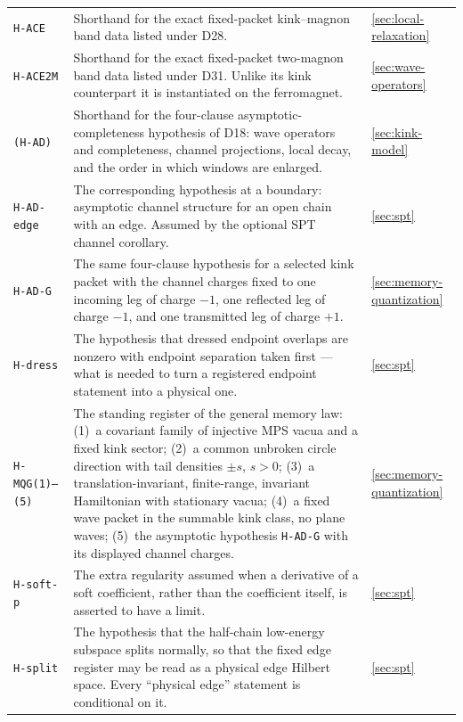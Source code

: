 {\begin{longtable}{@{}p{}p{}p{}@{}}
\texttt{H-ACE} & Shorthand for the exact fixed-packet kink--magnon band data
listed under D28. & \cref{sec:local-relaxation}\\

\texttt{H-ACE2M} & Shorthand for the exact fixed-packet two-magnon band data
listed under D31. Unlike its kink counterpart it is instantiated on the
ferromagnet. & \cref{sec:wave-operators}\\

\texttt{(H-AD)} & Shorthand for the four-clause asymptotic-completeness
hypothesis of D18: wave operators and completeness, channel projections, local
decay, and the order in which windows are enlarged. & \cref{sec:kink-model}\\

\texttt{H-AD-edge} & The corresponding hypothesis at a boundary: asymptotic
channel structure for an open chain with an edge. Assumed by the optional SPT
channel corollary. & \cref{sec:spt}\\

\texttt{H-AD-G} & The same four-clause hypothesis for a selected kink packet
with the channel charges fixed to one incoming leg of charge $-1$, one
reflected leg of charge $-1$, and one transmitted leg of charge $+1$. & \cref{sec:memory-quantization}\\

\texttt{H-dress} & The hypothesis that dressed endpoint overlaps are nonzero
with endpoint separation taken first --- what is needed to turn a registered
endpoint statement into a physical one. & \cref{sec:spt}\\

\texttt{H-MQG(1)--(5)} & The standing register of the general memory law:
(1)~a covariant family of injective MPS vacua and a fixed kink sector;
(2)~a common unbroken circle direction with tail densities $\pm s$, $s>0$;
(3)~a translation-invariant, finite-range, invariant Hamiltonian with
stationary vacua; (4)~a fixed wave packet in the summable kink class, no plane
waves; (5)~the asymptotic hypothesis \texttt{H-AD-G} with its displayed
channel charges. & \cref{sec:memory-quantization}\\

\texttt{H-soft-p} & The extra regularity assumed when a derivative of a soft
coefficient, rather than the coefficient itself, is asserted to have a limit. & \cref{sec:spt}\\

\texttt{H-split} & The hypothesis that the half-chain low-energy subspace
splits normally, so that the fixed edge register may be read as a physical
edge Hilbert space. Every ``physical edge'' statement is conditional on it. & \cref{sec:spt}\\


\end{longtable}}

